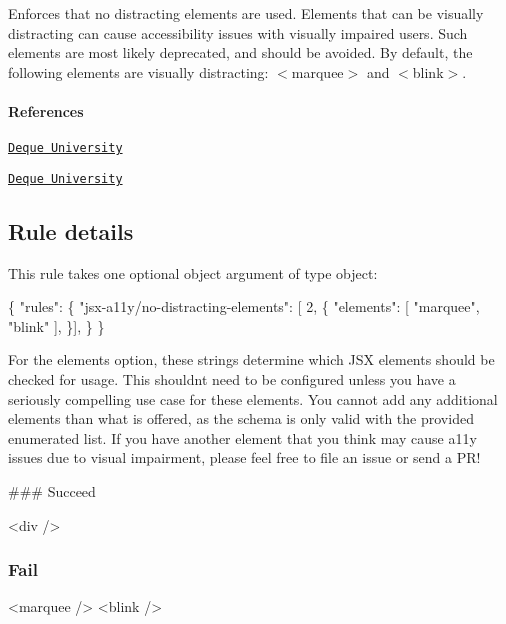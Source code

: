 Enforces that no distracting elements are used. Elements that can be visually distracting can cause accessibility issues with visually impaired users. Such elements are most likely deprecated, and should be avoided. By default, the following elements are visually distracting\+: {\ttfamily $<$marquee$>$} and {\ttfamily $<$blink$>$}.

\paragraph*{References}


\begin{DoxyEnumerate}
\item \href{https://dequeuniversity.com/rules/axe/1.1/marquee}{\tt Deque University}
\item \href{https://dequeuniversity.com/rules/axe/1.1/blink}{\tt Deque University}
\end{DoxyEnumerate}

\subsection*{Rule details}

This rule takes one optional object argument of type object\+:


\begin{DoxyCode}
\{
    "rules": \{
        "jsx-a11y/no-distracting-elements": [ 2, \{
            "elements": [ "marquee", "blink" ],
          \}],
    \}
\}
\end{DoxyCode}


For the {\ttfamily elements} option, these strings determine which J\+SX elements should be checked for usage. This shouldn\textquotesingle{}t need to be configured unless you have a seriously compelling use case for these elements. You cannot add any additional elements than what is offered, as the schema is only valid with the provided enumerated list. If you have another element that you think may cause a11y issues due to visual impairment, please feel free to file an issue or send a P\+R!

\#\#\# Succeed 
\begin{DoxyCode}
<div />
\end{DoxyCode}


\subsubsection*{Fail}


\begin{DoxyCode}
<marquee />
<blink />
\end{DoxyCode}
 